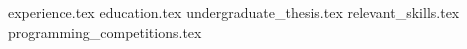 \documentclass[11pt, a4papter]{awesome-cv}
\newcommand*{\sectiondir}{sections/}
\begin{document}
\makecvheader

{experience.tex}
{education.tex}
{undergraduate_thesis.tex}
{relevant_skills.tex}
{programming_competitions.tex}
\end{document}
